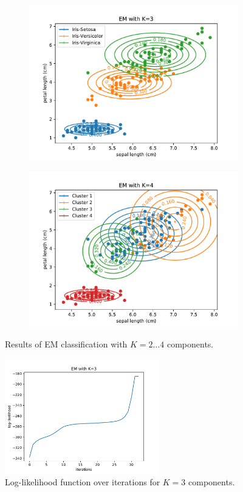 \documentclass{article}
\begin{document}
\begin{figure}[!ht]
{\begin{subfigure}{0.6\textwidth}
	\includegraphics[width=\textwidth]{./Figures/2_2_EM_cont_K3}
	\end{subfigure}
	\begin{subfigure}{0.6\textwidth}
	\includegraphics[width=\textwidth]{./Figures/2_2_EM_cont_K4}
	\end{subfigure}
	}	
	\caption{Results of EM classification with $K=2\dots4$ components.}
	\label{2_2_EM_cont}
\end{figure}

\begin{figure}[!ht]
\centering
\includegraphics[width=0.6\textwidth]{./Figures/2_2_EM_likelihood_K3}
\caption{Log-likelihood function over iterations for $K=3$ components.}
\label{2_2_EM_likelihood}
\end{figure}
\end{document}
